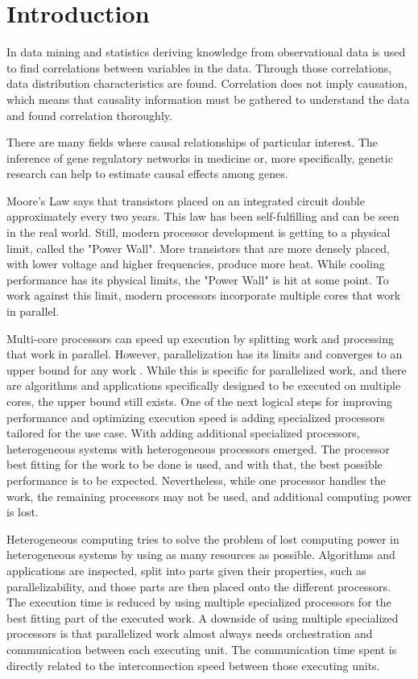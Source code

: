 \chapter{Introduction}
In data mining and statistics deriving knowledge from observational data is used to find correlations between variables in the data. Through those correlations, data distribution characteristics are found. Correlation does not imply causation, which means that causality information must be gathered to understand the data and found correlation thoroughly. 

There are many fields where causal relationships of particular interest. The inference of gene regulatory networks in medicine or, more specifically, genetic research can help to estimate causal effects among genes. \cite{rauJointEstimationCausal2013}

Moore's Law \cite{mooreCrammingMoreComponents1965} says that transistors placed on an integrated circuit double approximately every two years. This law has been self-fulfilling and can be seen in the real world. Still, modern processor development is getting to a physical limit, called the "Power Wall". More transistors that are more densely placed, with lower voltage and higher frequencies, produce more heat. While cooling performance has its physical limits, the "Power Wall" is hit at some point. To work against this limit, modern processors incorporate multiple cores that work in parallel.

Multi-core processors can speed up execution by splitting work and processing that work in parallel. However, parallelization has its limits and converges to an upper bound for any work \cite{amdahlValiditySingleProcessor1967}. While this is specific for parallelized work, and there are algorithms and applications specifically designed to be executed on multiple cores, the upper bound still exists. One of the next logical steps for improving performance and optimizing execution speed is adding specialized processors tailored for the use case. With adding additional specialized processors, heterogeneous systems with heterogeneous processors emerged. The processor best fitting for the work to be done is used, and with that, the best possible performance is to be expected. Nevertheless, while one processor handles the work, the remaining processors may not be used, and additional computing power is lost.

Heterogeneous computing tries to solve the problem of lost computing power in heterogeneous systems by using as many resources as possible. Algorithms and applications are inspected, split into parts given their properties, such as parallelizability, and those parts are then placed onto the different processors. The execution time is reduced by using multiple specialized processors for the best fitting part of the executed work. A downside of using multiple specialized processors is that parallelized work almost always needs orchestration and communication between each executing unit. The communication time spent is directly related to the interconnection speed between those executing units.


